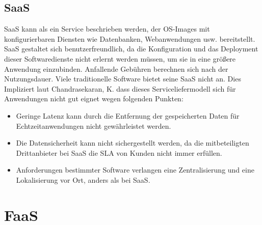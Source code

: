 \documentclass[
12pt,
english,
ngerman,
headsepline,
twoside,
openright,
numbers=noenddot,version=first
]{scrreprt}
\begin{document}
\section{SaaS} 
\label{sec:saas}
\acrfull{SaaS} kann als ein Service beschrieben werden, der OS-Images mit konfigurierbaren Diensten wie Datenbanken, Webanwendungen usw. bereitstellt. \acrshort{SaaS} gestaltet sich benutzerfreundlich, da die Konfiguration und das Deployment dieser Softwaredienste nicht erlernt werden müssen, um sie in eine größere Anwendung einzubinden. Anfallende Gebühren berechnen sich nach der Nutzungsdauer.
Viele traditionelle Software bietet seine \acrshort{SaaS} nicht an. Dies Impliziert laut Chandrasekaran, K. dass dieses Serviceliefermodell sich für Anwendungen nicht gut eignet wegen folgenden Punkten:
\begin{itemize}
	\item Geringe Latenz kann durch die Entfernung der gespeicherten Daten für Echtzeitanwendungen nicht gewährleistet werden.
	\item Die Datensicherheit kann nicht sichergestellt werden, da die mitbeteiligten Drittanbieter bei \acrshort{SaaS} die \acrfull{SLA} von Kunden nicht immer erfüllen.
	\item Anforderungen bestimmter Software verlangen eine Zentralisierung und eine Lokalisierung vor Ort, anders als bei \acrshort{SaaS}. 
\end{itemize}





\chapter{FaaS}%
\end{document}
